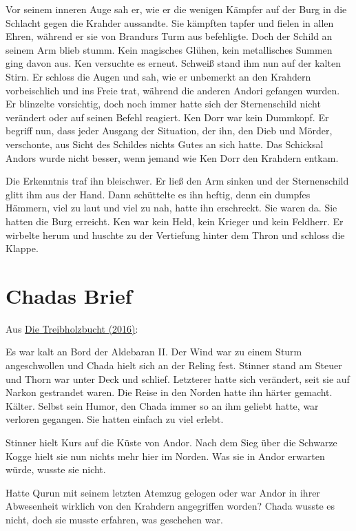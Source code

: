 \documentclass[10pt, a4paper, oneside]{book}
\newcommand{\fillbreak}{\vspace*{\fill}\columnbreak}
\newcommand{\reflegende}[1]{\hyperref[Legende: #1]{#1}}
\begin{document}
\begin{multicols}{2}
Vor seinem inneren Auge sah er, wie er die wenigen Kämpfer auf der Burg in die Schlacht gegen die Krahder aussandte. Sie kämpften tapfer und fielen in allen Ehren, während er sie von Brandurs Turm aus befehligte. Doch der Schild an seinem Arm blieb stumm. Kein magisches Glühen, kein metallisches Summen ging davon aus. Ken versuchte es erneut. Schweiß stand ihm nun auf der kalten Stirn. Er schloss die Augen und sah, wie er unbemerkt an den Krahdern vorbeischlich und ins Freie trat, während die anderen Andori gefangen wurden. Er blinzelte vorsichtig, doch noch immer hatte sich der Sternenschild nicht verändert oder auf seinen Befehl reagiert. Ken Dorr war kein Dummkopf. Er begriff nun, dass jeder Ausgang der Situation, der ihn, den Dieb und Mörder, verschonte, aus Sicht des Schildes nichts Gutes an sich hatte. Das Schicksal Andors wurde nicht besser, wenn jemand wie Ken Dorr den Krahdern entkam. 

Die Erkenntnis traf ihn bleischwer. Er ließ den Arm sinken und der Sternenschild glitt ihm aus der Hand. Dann schüttelte es ihn heftig, denn ein dumpfes Hämmern, viel zu laut und viel zu nah, hatte ihn erschreckt. Sie waren da. Sie hatten die Burg erreicht. Ken war kein Held, kein Krieger und kein Feldherr. Er wirbelte herum und huschte zu der Vertiefung hinter dem Thron und schloss die Klappe.






\fillbreak
\section{Chadas Brief}

\begin{center}
    Aus \reflegende{Die Treibholzbucht (2016)}:
\end{center}

Es war kalt an Bord der Aldebaran II. Der Wind war zu einem Sturm angeschwollen und Chada hielt sich an der Reling fest. Stinner stand am Steuer und Thorn war unter Deck und schlief. Letzterer hatte sich verändert, seit sie auf Narkon gestrandet waren. Die Reise in den Norden hatte ihn härter gemacht. Kälter. Selbst sein Humor, den Chada immer so an ihm geliebt hatte, war verloren gegangen. Sie hatten einfach zu viel erlebt.

Stinner hielt Kurs auf die Küste von Andor. Nach dem Sieg über die Schwarze Kogge hielt sie nun nichts mehr hier im Norden. Was sie in Andor erwarten würde, wusste sie nicht.

Hatte Qurun mit seinem letzten Atemzug gelogen oder war Andor in ihrer Abwesenheit wirklich von den Krahdern angegriffen worden? Chada wusste es nicht, doch sie musste erfahren, was geschehen war.


\end{multicols}
\end{document}
